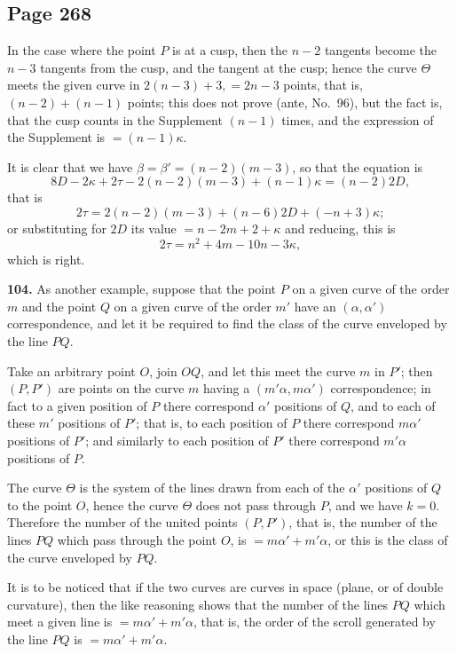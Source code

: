 \documentclass[11pt,a4paper]{article}
\theoremstyle{definition}
\begin{document}
\subsection*{Page 268}

In the case where the point $P$ is at a cusp, then the $n - 2$ tangents become the $n - 3$ tangents from the cusp, and the tangent at the cusp; hence the curve $\Theta$ meets the given curve in $2(n - 3) + 3, = 2n - 3$ points, that is, $(n - 2) + (n - 1)$ points; this does not prove (ante, No.~96), but the fact is, that the cusp counts in the Supplement $(n - 1)$ times, and the expression of the Supplement is $= (n - 1)\kappa$.

It is clear that we have $\beta = \beta' = (n - 2)(m - 3)$, so that the equation is
\[
8D - 2\kappa + 2\tau - 2(n - 2)(m - 3) + (n - 1)\kappa = (n - 2)2D,
\]
that is
\[
2\tau = 2(n - 2)(m - 3) + (n - 6)2D + (-n + 3)\kappa;
\]
or substituting for $2D$ its value $= n - 2m + 2 + \kappa$ and reducing, this is
\[
2\tau = n^2 + 4m - 10n - 3\kappa,
\]
which is right.

\medskip
\noindent\textbf{104.} As another example, suppose that the point $P$ on a given curve of the order $m$ and the point $Q$ on a given curve of the order $m'$ have an $(\alpha, \alpha')$ correspondence, and let it be required to find the class of the curve enveloped by the line $PQ$.

Take an arbitrary point $O$, join $OQ$, and let this meet the curve $m$ in $P'$; then $(P, P')$ are points on the curve $m$ having a $(m'\alpha, m\alpha')$ correspondence; in fact to a given position of $P$ there correspond $\alpha'$ positions of $Q$, and to each of these $m'$ positions of $P'$; that is, to each position of $P$ there correspond $m\alpha'$ positions of $P'$; and similarly to each position of $P'$ there correspond $m'\alpha$ positions of $P$.

The curve $\Theta$ is the system of the lines drawn from each of the $\alpha'$ positions of $Q$ to the point $O$, hence the curve $\Theta$ does not pass through $P$, and we have $k = 0$. Therefore the number of the united points $(P, P')$, that is, the number of the lines $PQ$ which pass through the point $O$, is $= m\alpha' + m'\alpha$, or this is the class of the curve enveloped by $PQ$.

It is to be noticed that if the two curves are curves in space (plane, or of double curvature), then the like reasoning shows that the number of the lines $PQ$ which meet a given line is $= m\alpha' + m'\alpha$, that is, the order of the scroll generated by the line $PQ$ is $= m\alpha' + m'\alpha$.
\end{document}
